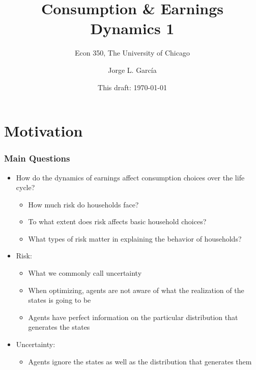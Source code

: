 

\title{Consumption \& Earnings Dynamics 1}
\subtitle{Econ 350, The University of Chicago}
\author{Jorge L. Garc\'{i}a}
\date{This draft: \today}






\begin{frame}[plain]
	\titlepage
\end{frame}



\section{Motivation}

\begin{frame}
	\frametitle{Main Questions}
\begin{itemize}
	\item How do the dynamics of earnings affect consumption choices over the life cycle?
		\begin{itemize}
			\item How much risk do households face?
			\item To what extent does risk affects basic household choices?
			\item What types of risk matter in explaining the behavior of households?		
		\end{itemize}
	\item Risk:
			\begin{itemize}
				\item What we commonly call uncertainty
				\item When optimizing, agents are not aware of what the realization of the states is going to be
				\item Agents have perfect information on the particular distribution that generates the states
			\end{itemize}
	\item Uncertainty:
			\begin{itemize}
				\item Agents ignore the states as well as the distribution that generates them
			\end{itemize}
\end{itemize}
\end{frame}

